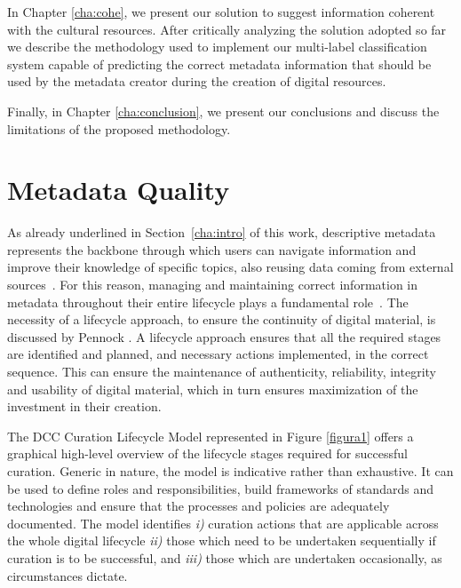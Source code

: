 \documentclass[epsfig,a4paper,12pt,titlepage]{book}
\begin{document}
In Chapter \ref{cha:cohe}, we present our solution to suggest information coherent with the cultural resources. After critically analyzing the solution adopted so far we describe the methodology used to implement our multi-label classification system capable of predicting the correct metadata information that should be used by the metadata creator during the creation of digital resources. 

Finally, in Chapter \ref{cha:conclusion}, we present our conclusions and discuss the limitations of the proposed methodology.


\chapter{Metadata Quality}
\label{cha:sota}
\chaptermark{}


As already underlined in Section~\ref{cha:intro} of this work, descriptive metadata represents the backbone through which users can navigate information and improve their knowledge of specific topics, also reusing data coming from external sources~\cite{26,27}.  For this reason,  managing and maintaining correct information in metadata throughout their entire lifecycle plays a fundamental role~\cite{37}. The necessity of a lifecycle approach, to ensure the continuity of digital material, is discussed by Pennock \cite{9}.  A lifecycle approach ensures that all the required stages are identified and planned, and necessary actions implemented, in the correct sequence. This can ensure the maintenance of authenticity, reliability, integrity and usability of digital material, which in turn ensures maximization of the investment in their creation.

The DCC Curation Lifecycle Model \cite{41} represented in Figure \ref{figura1} offers a graphical high-level overview of the lifecycle stages required for successful curation. Generic in nature, the model is indicative rather than exhaustive. It can be used to define roles and responsibilities, build frameworks of standards and technologies and ensure that the processes and policies are adequately documented. The model identifies \textit{i)} curation actions that are applicable across the whole digital lifecycle \textit{ii)} those which need to be undertaken sequentially if curation is to be successful, and \textit{iii)} those which are undertaken occasionally, as circumstances dictate.
\end{document}
